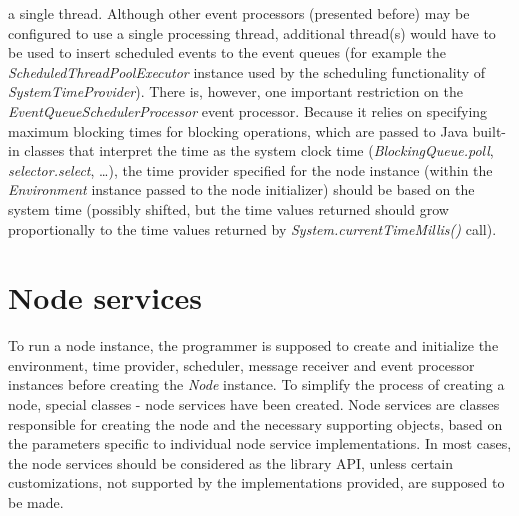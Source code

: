 \begin{itemize}
a single thread. Although other event processors (presented before) may be configured to use a single processing thread, additional thread(s) would have to be used to insert scheduled events to the event queues (for example the \emph{ScheduledThreadPoolExecutor} instance used by the scheduling functionality of \emph{SystemTimeProvider}). There is, however, one important restriction on the \emph{EventQueueSchedulerProcessor} event processor. Because it relies on specifying maximum blocking times for blocking operations, which are passed to Java built-in classes that interpret the time as the system clock time (\emph{BlockingQueue.poll}, \emph{selector.select}, \ldots), the time provider specified for the node instance (within the \emph{Environment} instance passed to the node initializer) should be based on the system time (possibly shifted, but the time values returned should grow proportionally to the time values returned by \emph{System.currentTimeMillis()} call).

\end{itemize}









\section{Node services}	
\label{sec:libNodeServices}

To run a node instance, the programmer is supposed to create and initialize the environment, time provider, scheduler, message receiver and event processor instances before creating the \emph{Node} instance. To simplify the process of creating a node, special classes - node services have been created. Node services are classes responsible for creating the node and the necessary supporting objects, based on the parameters specific to individual node service implementations. In most cases, the node services should be considered as the library API, unless certain customizations, not supported by the implementations provided, are supposed to be made.


